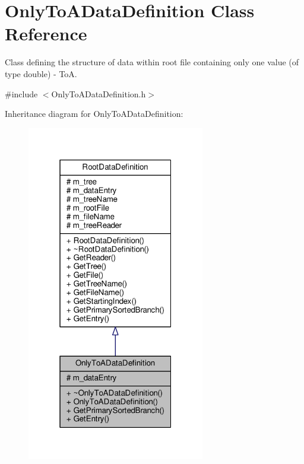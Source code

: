 \hypertarget{classOnlyToADataDefinition}{\section{Only\+To\+A\+Data\+Definition Class Reference}
\label{classOnlyToADataDefinition}
}


Class defining the structure of data within root file containing only one value (of type double) -\/ To\+A.  




{\ttfamily \#include $<$Only\+To\+A\+Data\+Definition.\+h$>$}



Inheritance diagram for Only\+To\+A\+Data\+Definition\+:
\nopagebreak
\begin{figure}[H]
\begin{center}
\leavevmode
\includegraphics[width=220pt]{classOnlyToADataDefinition__inherit__graph}
\end{center}
\end{figure}


